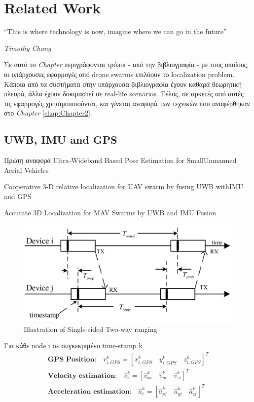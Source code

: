 \chapter{Related Work} \label{chap:Chapter3}       
\epigraph{``This is where technology is now, imagine where we can go in the future” }{\textit{Timothy Chung}}

Σε αυτό το \emph{Chapter} περιγράφονται τρόποι - από την βιβλιογραφία - με τους οποίους, οι υπάρχουσες εφαρμογές 
από drone swarms επιλύουν το localization problem. Κάποια από τα συστήματα στην υπάρχουσα βιβλιογραφία έχουν καθαρά
θεωρητική πλευρά, άλλα έχουν δοκιμαστεί σε real-life scenarios.
Τέλος, σε αρκετές από αυτές τις εφαρμογές χρησιμοποιούνται, 
και γίνεται αναφορά των τεχνικών που αναφέρθηκαν στο \emph{Chapter} \ref{chap:Chapter2}.



\section{UWB, IMU and GPS}
Πρώτη αναφορά \cite{uwb-imu-gps1} \cite{uwb-imu-gps2} \cite{uwb-imu-gps3}
Ultra-Wideband Based Pose Estimation for SmallUnmanned Aerial Vehicles

Cooperative 3-D relative localization for UAV swarm by fusing UWB withIMU and GPS

Accurate  3D  Localization  for  MAV  Swarms  by  UWB  and  IMU  Fusion

\begin{figure} [H]
	\centering
	\includegraphics[width=0.7\linewidth]{Images/Related-Work/Single-Sided-Two-Way-Ranging-SS-TWR-5.png}
	\decoRule
	\caption[Illustration of Single-sided Two-way ranging]{Illustration of Single-sided Two-way ranging \cite{uwb-imu-gps1}}
	\label{fig:SS-TWR}
\end{figure}

Για κάθε node i σε συγκεκριμένο time-stamp k 
\begin{gather*}
	\textbf{GPS Position:}\quad r^k_{i, GPS} = \left[x^k_{i, GPS} \quad y^k_{i, GPS} \quad z^k_{i, GPS}\right]^T \\
	\textbf{Velocity estimation:}\quad\hat{v}^k_i = \left[\hat{v}^k_{xi} \quad \hat{v}^k_{yi} \quad \hat{v}^k_{zi}\right]^T \\
	\textbf{Acceleration estimation:}\quad\hat{a}^k_i = \left[\hat{a}^k_{xi} \quad \hat{a}^k_{yi} \quad \hat{a}^k_{zi}\right]^T
\end{gather*}

